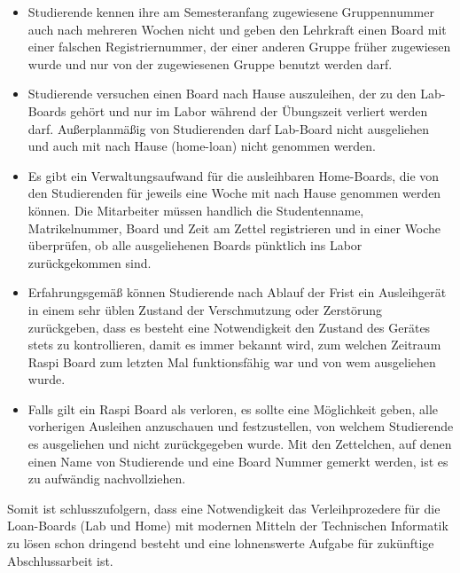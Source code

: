 \begin{itemize}
	\item Studierende kennen ihre am Semesteranfang zugewiesene Gruppennummer auch nach mehreren Wochen nicht und geben den Lehrkraft einen Board mit einer falschen Registriernummer, der einer anderen Gruppe früher zugewiesen wurde und nur von der zugewiesenen Gruppe benutzt werden darf. 
	\item Studierende versuchen  einen Board nach Hause auszuleihen, der zu den Lab-Boards gehört und nur im Labor während der Übungszeit verliert werden darf. Außerplanmäßig von Studierenden darf Lab-Board nicht ausgeliehen und auch mit nach Hause (home-loan) nicht genommen werden.
	\item Es gibt ein Verwaltungsaufwand für die ausleihbaren Home-Boards, die von den Studierenden für jeweils eine Woche mit nach Hause genommen werden können. Die Mitarbeiter müssen handlich die Studentenname, Matrikelnummer, Board und Zeit am Zettel registrieren und in einer Woche überprüfen, ob alle ausgeliehenen Boards pünktlich ins Labor zurückgekommen sind. 
	\item Erfahrungsgemäß können Studierende nach Ablauf der Frist ein Ausleihgerät in einem sehr üblen Zustand der Verschmutzung oder Zerstörung zurückgeben, dass es besteht eine Notwendigkeit den Zustand des Gerätes stets zu kontrollieren, damit es immer bekannt wird, zum welchen Zeitraum Raspi Board zum letzten Mal funktionsfähig war und von wem ausgeliehen wurde.  
	\item Falls gilt ein Raspi Board als verloren, es sollte eine Möglichkeit geben, alle vorherigen Ausleihen anzuschauen und festzustellen, von welchem Studierende es ausgeliehen und nicht zurückgegeben wurde. Mit den Zettelchen, auf denen einen Name von Studierende und eine Board Nummer gemerkt werden, ist es zu aufwändig nachvollziehen.	
\end{itemize}

Somit ist schlusszufolgern, dass eine Notwendigkeit das Verleihprozedere für die Loan-Boards (Lab und Home) mit modernen Mitteln der Technischen Informatik zu lösen schon dringend besteht und eine lohnenswerte Aufgabe für zukünftige Abschlussarbeit ist. 

